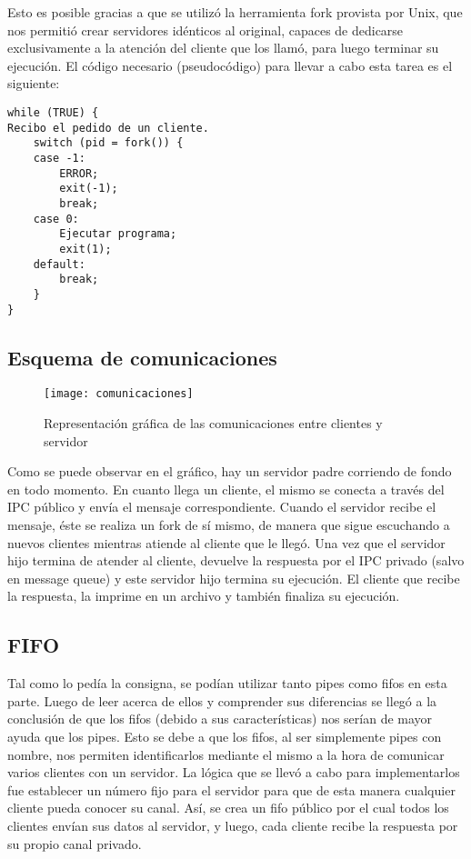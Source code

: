 \documentclass[a4paper, 10pt]{article}
\begin{document}
Esto es posible gracias a que se utilizó la herramienta fork provista por Unix, que nos permitió crear servidores idénticos al original, capaces de dedicarse exclusivamente a la atención del cliente que los llamó, para luego terminar su ejecución. El código necesario (pseudocódigo)  para llevar a cabo esta tarea es el siguiente:\\

\newpage
\begin{lstlisting}
while (TRUE) {
Recibo el pedido de un cliente.
	switch (pid = fork()) {
	case -1:
		ERROR;
		exit(-1);
		break;
	case 0:
		Ejecutar programa;
		exit(1);
	default:
		break;
	}
}
\end{lstlisting}
\vspace{1.5em}

\subsection{Esquema de comunicaciones}

\begin{figure}[h]
\centering
\texttt{[image: comunicaciones]}
\caption{Representación gráfica de las comunicaciones entre clientes y servidor}
\noindent
\end{figure}

Como se puede observar en el gráfico, hay un servidor padre corriendo de fondo en todo momento. En cuanto llega un cliente, el mismo se conecta a través del IPC público y envía el mensaje correspondiente. Cuando el servidor recibe el mensaje, éste se realiza un fork de sí mismo, de manera que sigue escuchando a nuevos clientes mientras atiende al cliente que le llegó. Una vez que el servidor hijo termina de atender al cliente, devuelve la respuesta por el IPC privado (salvo en message queue) y este servidor hijo termina su ejecución. El cliente que recibe la respuesta, la imprime en un archivo y también finaliza su ejecución.\\

\newpage
\subsection{FIFO}
Tal como lo pedía la consigna, se podían utilizar tanto pipes como fifos en esta parte. Luego de leer acerca de ellos y comprender sus diferencias se llegó a la conclusión de que los fifos (debido a sus características) nos serían de mayor ayuda que los pipes. Esto se debe a que los fifos, al ser simplemente pipes con nombre, nos permiten identificarlos mediante el mismo a la hora de comunicar varios clientes con un servidor. La lógica que se llevó a cabo para implementarlos fue establecer un número fijo para el servidor para que de esta manera cualquier cliente pueda conocer su canal. Así, se crea un fifo público por el cual todos los clientes envían sus datos al servidor, y luego, cada cliente recibe la respuesta por su propio canal privado.\\
\end{document}
